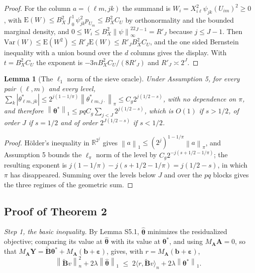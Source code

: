 \documentclass[10pt]{book}
\newtheorem{lemma}{Lemma}[section]
\theoremstyle{definition}
\newcommand{\R}{\mathbb{R}}
\newcommand{\E}{\mathrm{E}}
\newcommand{\Var}{\mathrm{Var}}
\newcommand{\norm}[1]{\left\lVert #1 \right\rVert}
\newcommand{\normn}[1]{\left\lVert #1 \right\rVert_{n}}
\newcommand{\inner}[2]{\langle #1, #2 \rangle}
\newcommand{\cv}{\ell}
\newcommand{\md}{m}
\newcommand{\lev}{j}
\newcommand{\tsl}{k}
\newcommand{\wav}[2]{\psi_{#1#2}}
\newcommand{\coefs}[4]{\theta^{*}_{#1#2,#3#4}}
\newcommand{\btheta}{\boldsymbol{\theta}}
\newcommand{\thetastar}{\btheta^{*}}
\newcommand{\thetahat}{\widehat{\btheta}}
\newcommand{\pen}{\lambda}
\newcommand{\Amat}{\mathbf{A}}
\newcommand{\Bmat}{\mathbf{B}}
\newcommand{\Btil}{\widetilde{\Bmat}}
\newcommand{\MA}{M_{\Amat}}
\newcommand{\bveps}{\boldsymbol{\varepsilon}}
\newcommand{\bb}{\mathbf{b}}
\newcommand{\bY}{\mathbf{Y}}
\begin{document}
\begin{proof}
For the column $a = (\cv\md,\lev\tsl)$ the summand is
$W_i = X_{i\cv}^2\wav{\lev}{\tsl}(U_{i\md})^2 \ge 0$, with
$\E(W) \le B_X^2\int_0^1\wav{\lev}{\tsl}^2p_{U_{\md}} \le B_X^2C_U$ by
orthonormality and the bounded marginal density, and
$0 \le W_i \le B_X^2\norm{\psi}_{\infty}^22^{J-1} = R'_J$ because
$\lev \le J-1$. Then $\Var(W) \le \E(W^2) \le R'_J\E(W) \le R'_JB_X^2C_U$, and
the one sided Bernstein inequality with a union bound over the $d$ columns
gives the display. With $t = B_X^2C_U$ the exponent is
$-3nB_X^2C_U/(8R'_J)$ and $R'_J \asymp 2^J$.
\end{proof}

\begin{lemma}[The $\ell_1$ norm of the sieve oracle]
\label{lem:l1}
Under Assumption 5, for every pair $(\cv,\md)$ and every level,
$\sum_{\tsl}|\coefs{\cv}{\md}{\lev}{\tsl}| \le
2^{\lev(1-1/\pi)}\norm{\theta^{*}_{\cv\md,\lev\cdot}}_{\pi} \le
C_g2^{\lev(1/2-s)}$, with no dependence on $\pi$, and therefore
$\norm{\thetastar}_1 \le pqC_g\sum_{\lev<J}2^{\lev(1/2-s)}$, which is
$O(1)$ if $s>1/2$, of order $J$ if $s = 1/2$ and of order
$2^{J(1/2-s)}$ if $s<1/2$.
\end{lemma}

\begin{proof}
Hölder's inequality in $\R^{2^{\lev}}$ gives
$\norm{a}_1 \le (2^{\lev})^{1-1/\pi}\norm{a}_{\pi}$, and Assumption 5 bounds
the $\ell_\pi$ norm of the level by $C_g2^{-\lev(s+1/2-1/\pi)}$; the resulting
exponent is $\lev(1-1/\pi)-\lev(s+1/2-1/\pi) = \lev(1/2-s)$, in which $\pi$
has disappeared. Summing over the levels below $J$ and over the $pq$ blocks
gives the three regimes of the geometric sum.
\end{proof}

\subsection*{Proof of Theorem 2}

\emph{Step 1, the basic inequality.} By Lemma S5.1, $\thetahat$ minimizes the
residualized objective; comparing its value at $\thetahat$ with its value at
$\thetastar$, and using $\MA\Amat = 0$, so that
$\MA\bY = \Btil\thetastar + \MA(\bb+\bveps)$, gives, with
$r = \MA(\bb+\bveps)$,
\begin{equation}
  \label{eq:basic}
  \normn{\Btil v}^2 + 2\pen\norm{\thetahat}_1
  \;\le\; 2\inner{r}{\Btil v}_n + 2\pen\norm{\thetastar}_1 .
\end{equation}
\end{document}

